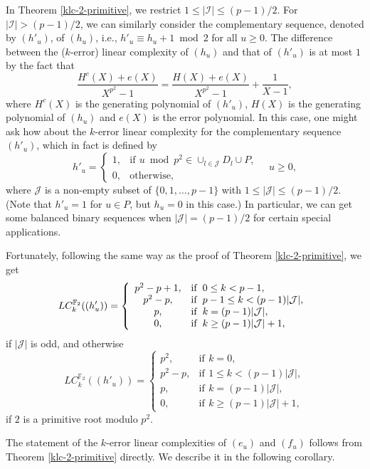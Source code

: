 \documentclass [11pt,a4paper]{article}
\def\F{\mathbb{F}}
\begin{document}
In Theorem \ref{klc-2-primitive}, we restrict $1\le |\mathcal{I}|\le (p-1)/2$. For $|\mathcal{I}|> (p-1)/2$, we can similarly consider the complementary sequence, denoted by $(h'_u)$, of $(h_u)$, i.e., $h'_u\equiv h_u+1 \bmod 2$ for all $u\ge 0$. The difference between the ($k$-error) linear complexity of $(h_u)$ and that of  $(h'_u)$ is at most $1$ by the fact that
$$
\frac{H^c(X)+e(X)}{X^{p^2}-1}=\frac{H(X)+e(X)}{X^{p^2}-1}+\frac{1}{X-1},
$$
where $H^c(X)$ is the generating polynomial of $(h'_u)$, $H(X)$ is the generating polynomial of $(h_u)$ and $e(X)$ is the error polynomial. In this case, one might ask how about the $k$-error linear complexity for the complementary sequence $(h'_u)$, which in fact is defined by
$$
h'_u=\left\{
\begin{array}{ll}
1, & \mathrm{if}\,\ u\bmod {p^2}\in \cup_{l\in \mathcal{J}} D_l\cup P,\\
0, & \mathrm{otherwise},
\end{array}
\right. \quad u\ge 0,
$$
where $\mathcal{J}$ is a non-empty subset of $\{0,1,\ldots,p-1\}$ with $1\le |\mathcal{J}|\le (p-1)/2$.
(Note that $h'_u=1$ for $u\in P$, but $h_u=0 $ in this case.)  In particular, we can get some balanced binary sequences when $|\mathcal{J}|= (p-1)/2$ for certain special applications.


Fortunately, following the same way as the proof of Theorem \ref{klc-2-primitive}, we get
\[
 LC^{\F_2}_k((h'_u))=\left\{
\begin{array}{cl}
p^2-p+1, & \mathrm{if}\,\  0\le k<p-1, \\
p^2-p, & \mathrm{if}\,\ p-1\le k<(p-1)|\mathcal{J}|, \\
p, & \mathrm{if}\,\  k= (p-1)|\mathcal{J}|, \\
0, & \mathrm{if}\,\ k\ge (p-1)|\mathcal{J}|+1,
\end{array}
\right.\\
\]
if $|\mathcal{J}|$ is odd, and otherwise
\[
 LC^{\F_2}_k((h'_u))=\left\{
\begin{array}{cl}
p^2, & \mathrm{if}\,\ k=0, \\
p^2-p, & \mathrm{if}\,\ 1\le k<(p-1)|\mathcal{J}|, \\
p, & \mathrm{if}\,\  k= (p-1)|\mathcal{J}|, \\
0, & \mathrm{if}\,\ k\ge (p-1)|\mathcal{J}|+1,
\end{array}
\right.
\]
if $2$ is a primitive root modulo $p^2$.


The statement of the $k$-error linear complexities of $(e_u)$ and $(f_u)$ follows from Theorem \ref{klc-2-primitive} directly.
We describe it in the following corollary.
\end{document}
